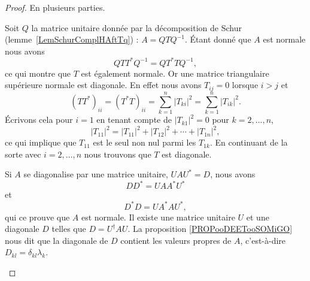 \begin{proof}

	En plusieurs parties.
	\begin{subproof}
		\spitem[\ref{ItemJZhFPSi} \( \Rightarrow\) \ref{ItemJZhFPSii}]
		Soit \( Q\) la matrice unitaire donnée par la décomposition de Schur (lemme~\ref{LemSchurComplHAftTq}) : \( A=QTQ^{-1}\). Étant donné que \( A\) est normale nous avons
		\begin{equation}
			QTT^*Q^{-1}=QT^*TQ^{-1},
		\end{equation}
		ce qui montre que \( T\) est également normale. Or une matrice triangulaire supérieure normale est diagonale. En effet nous avons \( T_{ij}=0\) lorsque \( i>j\) et
		\begin{equation}
			(TT^*)_{ii}=(T^*T)_{ii}=\sum_{k=1}^n| T_{ki} |^2=\sum_{k=1}^n| T_{ik} |^2.
		\end{equation}
		Écrivons cela pour \( i=1\) en tenant compte de \( | T_{k1} |^2=0\) pour \( k=2,\ldots, n\),
		\begin{equation}
			| T_{11} |^2=| T_{11} |^2+| T_{12} |^2+\cdots+| T_{1n} |^2,
		\end{equation}
		ce qui implique que \( T_{11}\) est le seul non nul parmi les \( T_{1k}\). En continuant de la sorte avec \( i=2,\ldots, n\) nous trouvons que \( T\) est diagonale.

		\spitem[\ref{ItemJZhFPSii} \( \Rightarrow\) \ref{ItemJZhFPSi}]
		Si \( A\) se diagonalise par une matrice unitaire, \( UAU^*=D\), nous avons
		\begin{equation}
			DD^*=UAA^*U^*
		\end{equation}
		et
		\begin{equation}
			D^*D=UA^*AU^*,
		\end{equation}
		qui ce prouve que \( A\) est normale.
		\spitem[\ref{ItemJZhFPSii} \( \Rightarrow\) \ref{ITEMooIIQTooQORrXP}]
		Il existe une matrice unitaire \( U\) et une diagonale \( D\) telles que \( D=U^{\dag}AU\). La proposition \ref{PROPooDEETooSOMiGO} nous dit que la diagonale de \( D\) contient les valeurs propres de \( A\), c'est-à-dire \( D_{kl}=\delta_{kl}\lambda_k\).


\end{subproof}
\end{proof}

